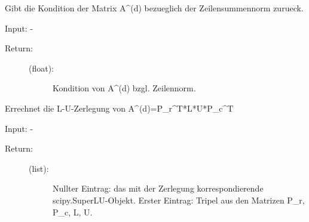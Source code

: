 \documentclass[letterpaper,10pt,ngerman]{sphinxmanual}
\begin{document}
\begin{fulllineitems}
\begin{fulllineitems}
\end{fulllineitems}


\begin{fulllineitems}
\label{\detokenize{index:sparse_erw.Sparse.kond_a_d_zs}}
Gibt die Kondition der Matrix A\textasciicircum{}(d) bezueglich der Zeilensummennorm zurueck.

Input: -
\begin{description}
\item[{Return:}] \leavevmode\begin{description}
\item[{(float):}] \leavevmode
Kondition von A\textasciicircum{}(d) bzgl. Zeilennorm.

\end{description}

\end{description}

\end{fulllineitems}


\begin{fulllineitems}
\label{\detokenize{index:sparse_erw.Sparse.l_u_zerl}}
Errechnet die L-U-Zerlegung von A\textasciicircum{}(d)=P\_r\textasciicircum{}T*L*U*P\_c\textasciicircum{}T

Input: -
\begin{description}
\item[{Return:}] \leavevmode\begin{description}
\item[{(list):}] \leavevmode
Nullter Eintrag: das mit der Zerlegung korrespondierende scipy.SuperLU-Objekt.
Erster Eintrag: Tripel aus den Matrizen P\_r, P\_c, L, U.

\end{description}

\end{description}

\end{fulllineitems}


\begin{fulllineitems}
\label{\detokenize{index:sparse_erw.Sparse.lgs_lsg}}~\begin{quote}


\end{quote}
\end{fulllineitems}
\end{fulllineitems}
\end{document}
